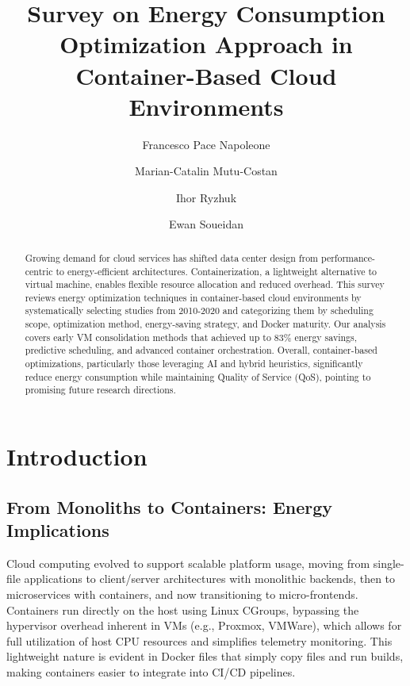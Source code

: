 \documentclass[runningheads]{llncs}
\begin{document}
\title{Survey on Energy Consumption Optimization Approach in Container-Based Cloud Environments}


\author{Francesco Pace Napoleone \and
Marian-Catalin Mutu-Costan \and
Ihor Ryzhuk \and
Ewan Soueidan}



\maketitle
%
\begin{abstract}

Growing demand for cloud services has shifted data center design from performance-centric to energy-efficient architectures. Containerization, a lightweight alternative to virtual machine, enables flexible resource allocation and reduced overhead. This survey reviews energy optimization techniques in container-based cloud environments by systematically selecting studies from 2010-2020 and categorizing them by scheduling scope, optimization method, energy-saving strategy, and Docker maturity. Our analysis covers early VM consolidation methods that achieved up to 83\% energy savings, predictive scheduling, and advanced container orchestration. Overall, container-based optimizations, particularly those leveraging AI and hybrid heuristics, significantly reduce energy consumption while maintaining Quality of Service (QoS), pointing to promising future research directions.

\end{abstract}

\section{Introduction}

\subsection{From Monoliths to Containers: Energy Implications}
Cloud computing evolved to support scalable platform usage, moving from single-file applications to client/server 
architectures with monolithic backends, then to microservices with containers, and now transitioning to micro-frontends. 
Containers run directly on the host using Linux CGroups, bypassing the hypervisor overhead inherent in VMs (e.g., 
Proxmox, VMWare), which allows for full utilization of host CPU resources and simplifies telemetry monitoring. 
This lightweight nature is evident in Docker files that simply copy files and run builds, making containers easier to integrate 
into CI/CD pipelines.
\end{document}
